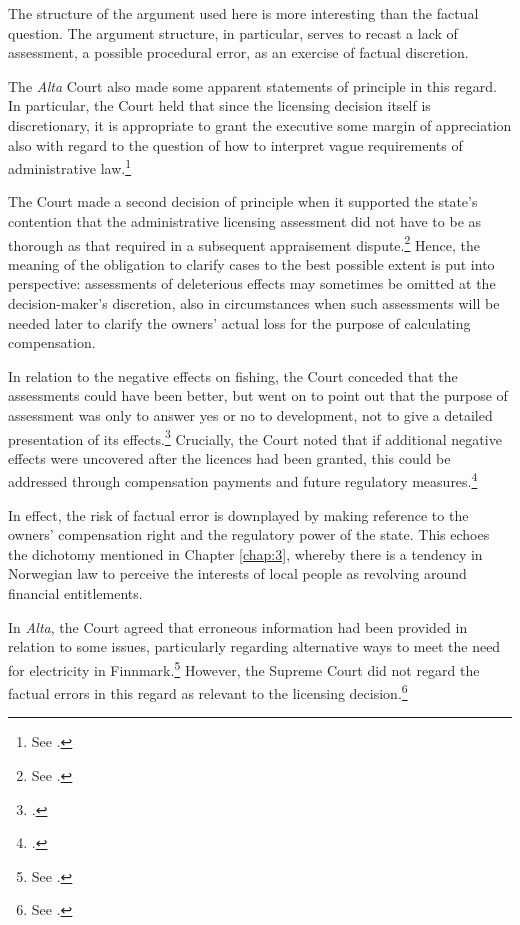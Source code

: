 The structure of the argument used here is more interesting than the factual question. The argument structure, in particular, serves to recast a lack of assessment, a possible procedural error, as an exercise of factual discretion.

The {\it Alta} Court also made some apparent statements of principle in this regard. In particular, the Court held that since the licensing decision itself is discretionary, it is appropriate to grant the executive some margin of appreciation also with regard to the question of how to interpret vague requirements of administrative law.\footnote{See \cite[262-264]{alta82}.}


The Court made a second decision of principle when it supported the state's contention that the administrative licensing assessment did not have to be as thorough as that required in a subsequent appraisement dispute.\footnote{See \cite[279|330]{alta82}.} Hence, the meaning of the obligation to clarify cases to the best possible extent is put into perspective: assessments of deleterious effects may sometimes be omitted at the decision-maker's discretion, also in circumstances when such assessments will be needed later to clarify the owners' actual loss for the purpose of calculating compensation.

In relation to the negative effects on fishing, the Court conceded that the assessments could have been better, but went on to point out that the purpose of assessment was only to answer yes or no to development, not to give a detailed presentation of its effects.\footcite[330]{alta82} Crucially, the Court noted that if additional negative effects were uncovered after the licences had been granted, this could be addressed through compensation payments and future regulatory measures.\footcite[330]{alta82}

In effect, the risk of factual error is downplayed by making reference to the owners' compensation right and the regulatory power of the state. This echoes the dichotomy mentioned in Chapter \ref{chap:3}, whereby there is a tendency in Norwegian law to perceive the interests of local people as revolving around financial entitlements.

In {\it Alta}, the Court agreed that erroneous information had been provided in relation to some issues, particularly regarding alternative ways to meet the need for electricity in Finnmark.\footnote{See \cite[346-357]{alta82}.} However, the Supreme Court did not regard the factual errors in this regard as relevant to the licensing decision.\footnote{See \cite[346]{alta82}.}

